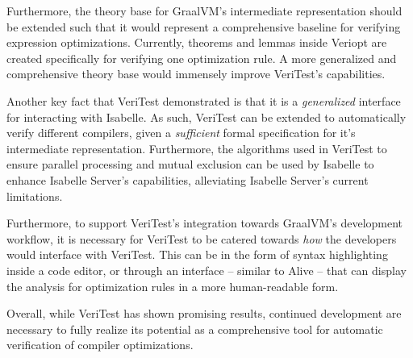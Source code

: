Furthermore, the theory base for GraalVM's intermediate representation should be extended such that it would represent a 
comprehensive baseline for verifying expression optimizations. Currently, theorems and lemmas inside Veriopt are created specifically for verifying 
one optimization rule. A more generalized and comprehensive theory base would immensely improve VeriTest's capabilities.


Another key fact that VeriTest demonstrated is that it is a \emph{generalized} interface for interacting with Isabelle. As such, VeriTest 
can be extended to automatically verify different compilers, given a \emph{sufficient} formal specification for it's intermediate representation.
Furthermore, the algorithms used in VeriTest to ensure parallel processing and mutual exclusion can be used by Isabelle to enhance Isabelle Server's 
capabilities, alleviating Isabelle Server's current limitations.

Furthermore, to support VeriTest's integration towards GraalVM's development workflow, it is necessary for VeriTest to be catered towards 
\emph{how} the developers would interface with VeriTest. This can be in the form of syntax highlighting inside a code editor, or through an 
interface -- similar to Alive -- that can display the analysis for optimization rules in a more human-readable form.

Overall, while VeriTest has shown promising results, continued development are necessary to fully realize its potential as a 
comprehensive tool for automatic verification of compiler optimizations.